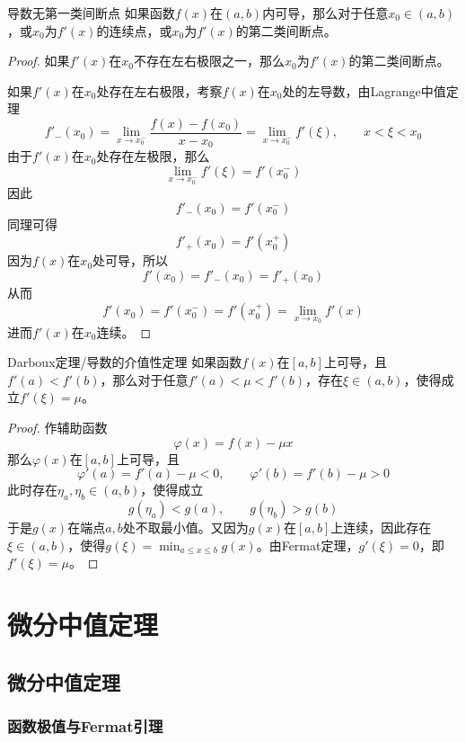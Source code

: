 \documentclass[lang = cn, scheme = chinese, thmcnt = section]{elegantbook}
\begin{document}
\begin{theorem}{导数无第一类间断点}
	如果函数$f(x)$在$(a,b)$内可导，那么对于任意$x_0\in (a,b)$，或$x_0$为$f'(x)$的连续点，或$x_0$为$f'(x)$的第二类间断点。
\end{theorem}

\begin{proof}
	如果$f'(x)$在$x_0$不存在左右极限之一，那么$x_0$为$f'(x)$的第二类间断点。
	
	如果$f'(x)$在$x_0$处存在左右极限，考察$f(x)$在$x_0$处的左导数，由Lagrange中值定理
	$$
	f'_-(x_0)
	=\lim_{x\to x_0^-}\frac{f(x)-f(x_0)}{x-x_0}
	=\lim_{x\to x_0^-}f'(\xi),\qquad x<\xi<x_0
	$$
	由于$f'(x)$在$x_0$处存在左极限，那么
	$$
	\lim_{x\to x_0^-}f'(\xi)=f'(x_0^-)
	$$
	因此
	$$
	f'_-(x_0)=f'(x_0^-)
	$$
	同理可得
	$$
	f'_+(x_0)=f'(x_0^+)
	$$
	因为$f(x)$在$x_0$处可导，所以
	$$
	f'(x_0)=f'_-(x_0)=f'_+(x_0)
	$$
	从而
	$$
	f'(x_0)=f'(x_0^-)=f'(x_0^+)=\lim_{x\to x_0}f'(x)
	$$
	进而$f'(x)$在$x_0$连续。
\end{proof}

\begin{theorem}{Darboux定理/导数的介值性定理}
	如果函数$f(x)$在$[a,b]$上可导，且$f'(a)<f'(b)$，那么对于任意$f'(a)<\mu<f'(b)$，存在$\xi\in (a,b)$，使得成立$f'(\xi)=\mu$。
\end{theorem}

\begin{proof}
	作辅助函数
	$$
	\varphi(x)=f(x)-\mu x
	$$
	那么$\varphi(x)$在$[a,b]$上可导，且
	$$
	\varphi'(a)=f'(a)-\mu<0,\qquad 
	\varphi'(b)=f'(b)-\mu>0
	$$
	此时存在$\eta_a,\eta_b\in(a,b)$，使得成立
	$$
	g(\eta_a)<g(a),\qquad 
	g(\eta_b)>g(b)
	$$
	于是$g(x)$在端点$a,b$处不取最小值。又因为$g(x)$在$[a,b]$上连续，因此存在$\xi\in (a,b)$，使得$\displaystyle g(\xi)=\min_{a\le x\le b}g(x)$。由Fermat定理，$g'(\xi)=0$，即$f'(\xi)=\mu$。
\end{proof}

\chapter{微分中值定理}

\section{微分中值定理}

\subsection{函数极值与Fermat引理}
\end{document}
